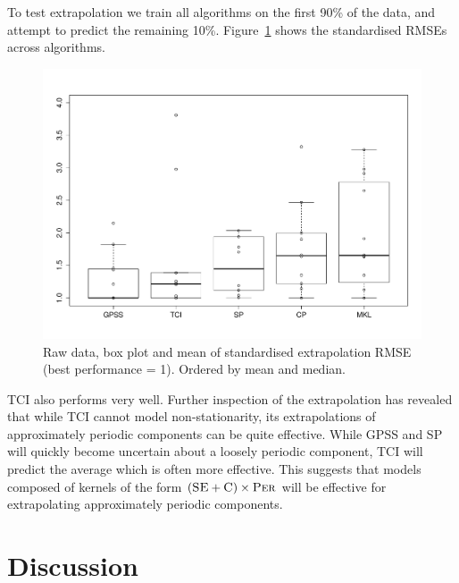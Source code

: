 \documentclass{article}
\begin{document}
To test extrapolation we train all algorithms on the first 90\% of the data, and attempt to predict the remaining 10\%.
Figure~\ref{fig:extrap_box} shows the standardised RMSEs across algorithms.

\begin{figure}[h]
\centering
\includegraphics[width=\columnwidth]{figures/extrapolation_box}
\caption{
Raw data, box plot and mean of standardised extrapolation RMSE (best performance = 1).
Ordered by mean and median.
}
\label{fig:extrap_box}
\end{figure}

TCI also performs very well.
Further inspection of the extrapolation has revealed that while TCI cannot model non-stationarity, its extrapolations of approximately periodic components can be quite effective.
While GPSS and SP will quickly become uncertain about a loosely periodic component, TCI will predict the average which is often more effective.
This suggests that models composed of kernels of the form $({\textsc{SE}} + {\textsc{C}}) \times {\textsc{Per}}$ will be effective for extrapolating approximately periodic components.

\section{Discussion}
\end{document}
